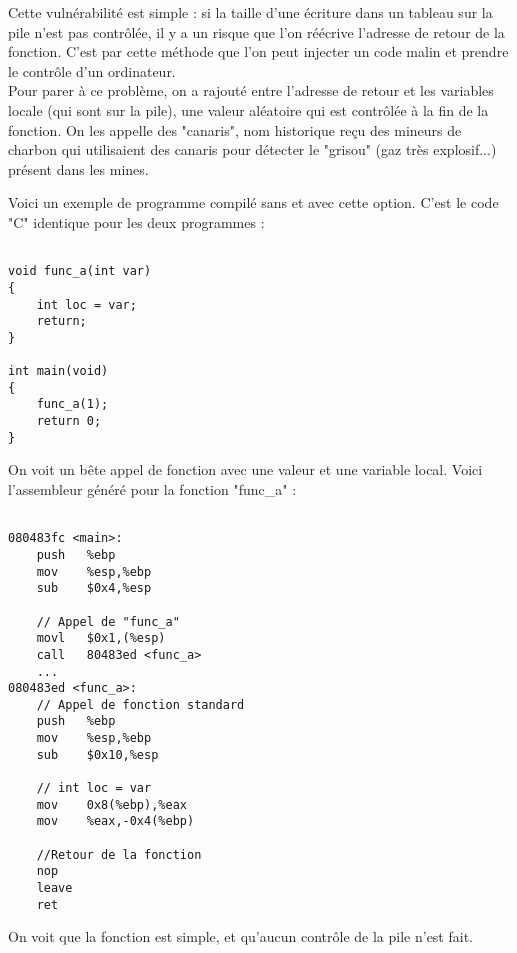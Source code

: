 Cette vulnérabilité est simple : si la taille d'une écriture dans un tableau  sur la pile n'est pas contrôlée, il y a un risque que l'on réécrive l'adresse de retour de la fonction. C'est par cette méthode que l'on peut injecter un code malin et prendre le contrôle d'un ordinateur. \\
Pour parer à ce problème, on a rajouté entre l'adresse de retour et les variables locale (qui sont sur la pile), une valeur aléatoire qui est contrôlée à la fin de la fonction. On les appelle des "canaris", nom historique reçu des mineurs de charbon qui utilisaient des canaris pour détecter le "grisou" (gaz très explosif...) présent dans les mines. 

Voici un exemple de programme compilé sans et avec cette option. C'est le code "C" identique pour les deux programmes :
\begin{lstlisting}[frame=single,style=C]  % Start your code-block

void func_a(int var)
{
	int loc = var;
	return;
}

int main(void)
{
	func_a(1);
	return 0;
}
\end{lstlisting}

On voit un bête appel de fonction avec une valeur et une variable local. Voici l'assembleur généré pour la fonction "func\_a" :
\begin{lstlisting}[frame=single,style=C]  % Start your code-block

080483fc <main>:
	push   %ebp
	mov    %esp,%ebp
	sub    $0x4,%esp
	
	// Appel de "func_a"
	movl   $0x1,(%esp)
	call   80483ed <func_a>
	... 
080483ed <func_a>:
	// Appel de fonction standard
	push   %ebp
	mov    %esp,%ebp
	sub    $0x10,%esp
	
	// int loc = var
	mov    0x8(%ebp),%eax
	mov    %eax,-0x4(%ebp)
	
	//Retour de la fonction
	nop
	leave  
	ret  
\end{lstlisting}

On voit que la fonction est simple, et qu'aucun contrôle de la pile n'est fait. 

